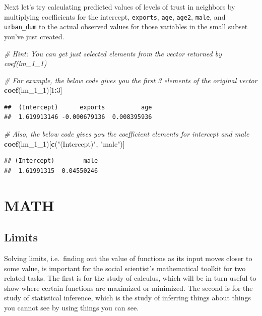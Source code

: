 \documentclass[
]{book}
\newenvironment{Shaded}{\begin{snugshade}}{\end{snugshade}}
\newcommand{\CommentTok}[1]{\textcolor[rgb]{0.56,0.35,0.01}{\textit{#1}}}
\newcommand{\DecValTok}[1]{\textcolor[rgb]{0.00,0.00,0.81}{#1}}
\newcommand{\KeywordTok}[1]{\textcolor[rgb]{0.13,0.29,0.53}{\textbf{#1}}}
\newcommand{\NormalTok}[1]{#1}
\newcommand{\OperatorTok}[1]{\textcolor[rgb]{0.81,0.36,0.00}{\textbf{#1}}}
\newcommand{\StringTok}[1]{\textcolor[rgb]{0.31,0.60,0.02}{#1}}
\theoremstyle{definition}
\theoremstyle{definition}
\theoremstyle{definition}
\theoremstyle{definition}
\theoremstyle{remark}
\begin{document}
Next let's try calculating predicted values of levels of trust in neighbors by multiplying coefficients for the intercept, \texttt{exports}, \texttt{age}, \texttt{age2}, \texttt{male}, and \texttt{urban\_dum} to the actual observed values for those variables in the small subset you've just created.

\begin{Shaded}
\begin{Highlighting}[]
\CommentTok{# Hint: You can get just selected elements from the vector returned by coef(lm_1_1)}

\CommentTok{# For example, the below code gives you the first 3 elements of the original vector}
\KeywordTok{coef}\NormalTok{(lm_}\DecValTok{1}\NormalTok{_}\DecValTok{1}\NormalTok{)[}\DecValTok{1}\OperatorTok{:}\DecValTok{3}\NormalTok{]}
\end{Highlighting}
\end{Shaded}

\begin{verbatim}
##  (Intercept)      exports          age 
##  1.619913146 -0.000679136  0.008395936
\end{verbatim}

\begin{Shaded}
\begin{Highlighting}[]
\CommentTok{# Also, the below code gives you the coefficient elements for intercept and male}
\KeywordTok{coef}\NormalTok{(lm_}\DecValTok{1}\NormalTok{_}\DecValTok{1}\NormalTok{)[}\KeywordTok{c}\NormalTok{(}\StringTok{"(Intercept)"}\NormalTok{, }\StringTok{"male"}\NormalTok{)]}
\end{Highlighting}
\end{Shaded}

\begin{verbatim}
## (Intercept)        male 
##  1.61991315  0.04550246
\end{verbatim}

\hypertarget{part-math}{%
\part{MATH}\label{part-math}}

\hypertarget{limits-precalc}{%
\chapter{Limits}\label{limits-precalc}}

Solving limits, i.e.~finding out the value of functions as its input moves closer to some value, is important for the social scientist's mathematical toolkit for two related tasks. The first is for the study of calculus, which will be in turn useful to show where certain functions are maximized or minimized. The second is for the study of statistical inference, which is the study of inferring things about things you cannot see by using things you can see.
\end{document}

